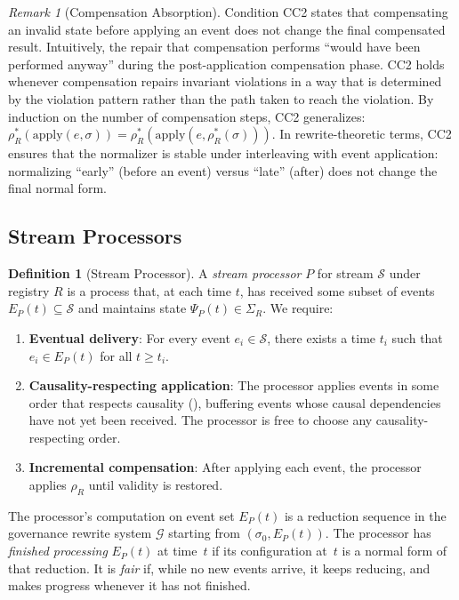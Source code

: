 \documentclass[11pt,a4paper]{article}
\theoremstyle{plain}
\theoremstyle{definition}
\newtheorem{definition}[theorem]{Definition}
\theoremstyle{remark}
\newtheorem{remark}[theorem]{Remark}
\begin{document}
\begin{remark}[Compensation Absorption]
\label{rem:absorption}
Condition CC2 states that compensating an invalid state before applying an
event does not change the final compensated result.  Intuitively, the
repair that compensation performs ``would have been performed anyway'' during
the post-application compensation phase.  CC2 holds whenever compensation
repairs invariant violations in a way that is determined by the violation
pattern rather than the path taken to reach the violation.  By induction on
the number of compensation steps, CC2 generalizes:
$\rho_R^*(\mathrm{apply}(e, \sigma)) =
\rho_R^*(\mathrm{apply}(e, \rho_R^*(\sigma)))$.
In rewrite-theoretic terms, CC2 ensures that the normalizer is stable under
interleaving with event application: normalizing ``early'' (before an event)
versus ``late'' (after) does not change the final normal form.
\end{remark}

\subsection{Stream Processors}

\begin{definition}[Stream Processor]
\label{def:processor}
A \emph{stream processor} $P$ for stream $\mathcal{S}$ under registry $R$ is a
process that, at each time $t$, has received some subset of events
$E_P(t) \subseteq \mathcal{S}$ and maintains state $\Psi_P(t) \in \Sigma_R$.
We require:
\begin{enumerate}[leftmargin=*,nosep]
\item \textbf{Eventual delivery}: For every event $e_i \in \mathcal{S}$, there
  exists a time $t_i$ such that $e_i \in E_P(t)$ for all $t \geq t_i$.
\item \textbf{Causality-respecting application}: The processor applies events
  in some order that respects causality (), buffering
  events whose causal dependencies have not yet been received.  The processor
  is free to choose any causality-respecting order.
\item \textbf{Incremental compensation}: After applying each event, the
  processor applies $\rho_R$ until validity is restored.
\end{enumerate}
The processor's computation on event set $E_P(t)$ is a reduction sequence in
the governance rewrite system $\mathcal{G}$ starting from
$(\sigma_0, E_P(t))$.  The processor has \emph{finished processing} $E_P(t)$
at time~$t$ if its configuration at~$t$ is a normal form of that reduction.
It is \emph{fair} if, while no new events arrive, it keeps reducing, and makes
progress whenever it has not finished.
\end{definition}
\end{document}
